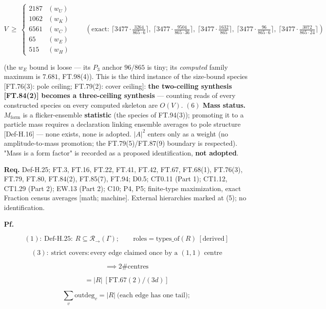 \begin{theorem}
\[
V\ \ge\ \begin{cases}2187 & (w_U)\\ 1062 & (w_K)\\ 6561 & (w_C)\\ 65 & (w_E)\\ 515 & (w_H)\end{cases}
\qquad(\text{exact: } \lceil 3477\cdot\tfrac{3264}{865\cdot6}\rceil,\ \lceil 3477\cdot\tfrac{9504}{865\cdot36}\rceil,\ \lceil 3477\cdot\tfrac{1632}{865}\rceil,\ \lceil 3477\cdot\tfrac{96}{865\cdot6}\rceil,\ \lceil 3477\cdot\tfrac{3072}{865\cdot24}\rceil)
\]

(the $w_E$ bound is loose — its $P_3$ anchor $96/865$ is tiny; its \textit{computed} family maximum is $7.681$, FT.98(4)). This is the third instance of the size-bound species [FT.76(3): pole ceiling; FT.79(2): cover ceiling]: \textbf{the two-ceiling synthesis [FT.84(2)] becomes a three-ceiling synthesis} — counting reads of every constructed species on every computed skeleton are $O(V)$. $(6)$ \textbf{Mass status.} $M_{\mathrm{form}}$ is a flicker-ensemble \textbf{statistic} (the species of FT.94(3)); promoting it to a particle mass requires a declaration linking ensemble averages to pole structure [Def-H.16] — none exists, none is adopted. $|A|^2$ enters only as a weight (no amplitude-to-mass promotion; the FT.79(5)/FT.87(9) boundary is respected). "Mass is a form factor" is recorded as a proposed identification, \textbf{not adopted}.

\textbf{Req.} Def-H.25; FT.3, FT.16, FT.22, FT.41, FT.42, FT.67, FT.68(1), FT.76(3), FT.79, FT.80, FT.84(2), FT.85(7), FT.94; D0.5; CT0.11 (Part 1); CT1.12, CT1.29 (Part 2); EW.13 (Part 2); C10; P4, P5; finite-type maximization, exact Fraction census averages [math; machine]. External hierarchies marked at (5); no identification.

\textbf{Pf.}

\[
(1):\ \mathrm{Def\text{-}H.25}:\ R\subseteq\mathcal R_{\rightarrow}(\Gamma);\qquad\text{roles}=\mathrm{types\_of}(R)\ [\text{derived}]
\]

\[
(3):\ \text{strict covers}: \text{every edge claimed once by a }(1,1)\text{ centre}
\]

\[
\implies 2\#\mathrm{centres}
\]

\[
= |R|\ [\mathrm{FT.67}(2)/(3d)]
\]

\[
\sum_v\mathrm{outdeg}_v=|R|\ \text{(each edge has one tail)};
\]


\end{theorem}
